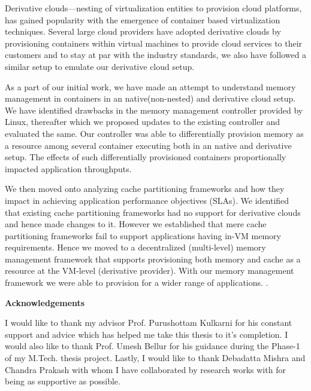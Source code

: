 \documentclass[11pt,a4paper]{report}
\begin{document}
    Derivative clouds---nesting of virtualization entities to provision cloud platforms, has gained popularity 
    with the emergence of container based virtualization techniques. Several large cloud providers \cite{gcp, heroku, sapcp}
    have adopted derivative clouds by provisioning containers within virtual machines to provide cloud services to their 
    customers and to stay at par with the industry standards, we also have followed a similar setup to emulate our derivative 
    cloud setup.
    
    As a part of our initial work, we have made an attempt to understand memory management in containers in an native(non-nested)
    and derivative cloud setup. We have identified drawbacks in the memory management controller provided by Linux, thereafter which
    we proposed updates to the existing controller and evaluated the same. Our controller was able to differentially provision memory as
    a resource among several container executing both in an native and derivative setup. The effects of such differentially 
    provisioned containers proportionally impacted application throughputs.
    
    We then moved onto analyzing cache partitioning frameworks and how they impact in achieving application performance 
    objectives (SLAs). We identified that existing cache partitioning frameworks had no support for derivative clouds and
    hence made changes to it. However we established that mere cache partitioning frameworks fail to support applications 
    having in-VM memory requirements. Hence we moved to a decentralized (multi-level) memory management framework that
    supports provisioning both memory and cache as a resource at the VM-level (derivative provider). With our memory 
    management framework we were able to provision for a wider range of applications. 
  . 
    
    \newpage
    \begin{center}
      \huge \textbf{Acknowledgements}
    \end{center}
    \vspace*{3em}
    \normalsize 
    
    I would like to thank my advisor Prof. Purushottam Kulkarni for his constant support and advice which has helped me take 
    this thesis to it’s completion. I would also like to thank Prof. Umesh Bellur for his guidance during the Phase-1 of my 
    M.Tech. thesis project. Lastly, I would like to thank Debadatta Mishra and Chandra Prakash with whom I have collaborated by 
    research works with for being as supportive as possible.
    
\end{document}
